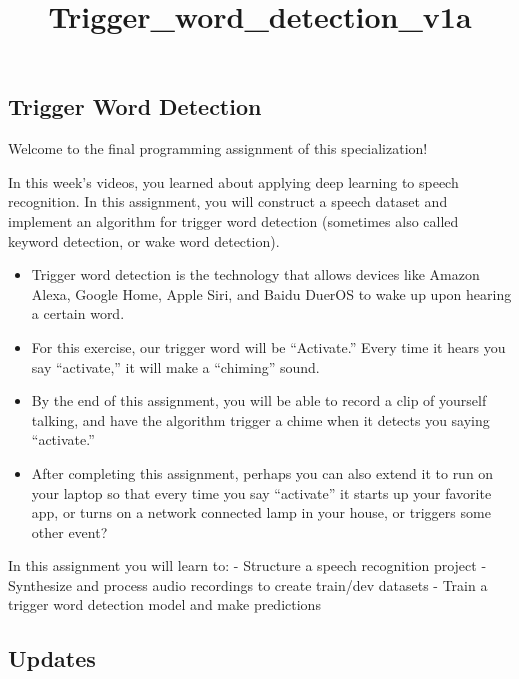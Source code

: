 \documentclass[11pt]{article}
\title{Trigger\_word\_detection\_v1a}
\begin{document}
    
    
    \maketitle
    
    

    
    \subsection{Trigger Word Detection}\label{trigger-word-detection}

Welcome to the final programming assignment of this specialization!

In this week's videos, you learned about applying deep learning to
speech recognition. In this assignment, you will construct a speech
dataset and implement an algorithm for trigger word detection (sometimes
also called keyword detection, or wake word detection).

\begin{itemize}
\itemsep1pt\parskip0pt
\item
  Trigger word detection is the technology that allows devices like
  Amazon Alexa, Google Home, Apple Siri, and Baidu DuerOS to wake up
  upon hearing a certain word.\\
\item
  For this exercise, our trigger word will be ``Activate.'' Every time
  it hears you say ``activate,'' it will make a ``chiming'' sound.
\item
  By the end of this assignment, you will be able to record a clip of
  yourself talking, and have the algorithm trigger a chime when it
  detects you saying ``activate.''
\item
  After completing this assignment, perhaps you can also extend it to
  run on your laptop so that every time you say ``activate'' it starts
  up your favorite app, or turns on a network connected lamp in your
  house, or triggers some other event?
\end{itemize}

In this assignment you will learn to: - Structure a speech recognition
project - Synthesize and process audio recordings to create train/dev
datasets - Train a trigger word detection model and make predictions

    \subsection{Updates}\label{updates}
\end{document}
